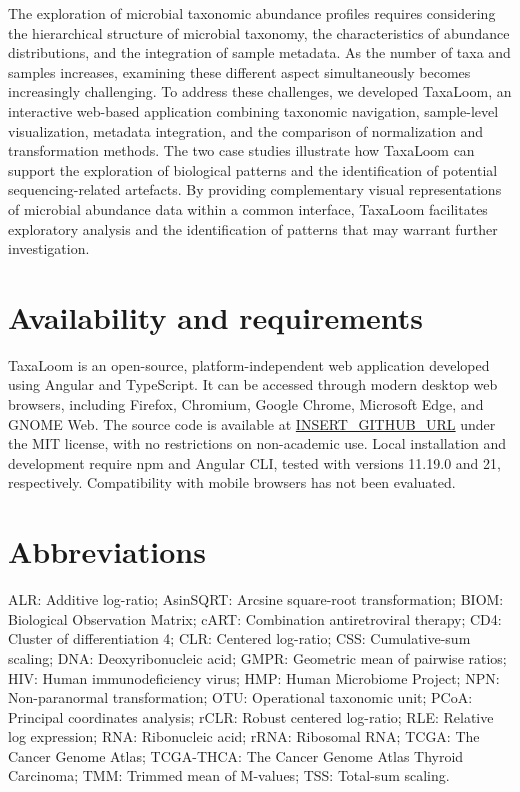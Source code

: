 \documentclass[pdflatex,sn-vancouver-num]{sn-jnl}%
\theoremstyle{thmstyleone}%
\theoremstyle{thmstyletwo}%
\theoremstyle{thmstylethree}%
\begin{document}
The exploration of microbial taxonomic abundance profiles requires considering the hierarchical structure of microbial taxonomy, the characteristics of abundance distributions, and the integration of sample metadata. As the number of taxa and samples increases, examining these different aspect simultaneously becomes increasingly challenging. To address these challenges, we developed TaxaLoom, an interactive web-based application combining taxonomic navigation, sample-level visualization, metadata integration, and the comparison of normalization and transformation methods. The two case studies illustrate how TaxaLoom can support the exploration of biological patterns and the identification of potential sequencing-related artefacts. By providing complementary visual representations of microbial abundance data within a common interface, TaxaLoom facilitates exploratory analysis and the identification of patterns that may warrant further investigation.


\section*{Availability and requirements}\label{sec6}

TaxaLoom is an open-source, platform-independent web application developed using Angular and TypeScript. It can be accessed through modern desktop web browsers, including Firefox, Chromium, Google Chrome, Microsoft Edge, and GNOME Web. The source code is available at \url{INSERT_GITHUB_URL} under the MIT license, with no restrictions on non-academic use. Local installation and development require npm and Angular CLI, tested with versions 11.19.0 and 21, respectively. Compatibility with mobile browsers has not been evaluated.


\section*{Abbreviations}

ALR: Additive log-ratio; AsinSQRT: Arcsine square-root transformation; BIOM: Biological Observation Matrix; cART: Combination antiretroviral therapy; CD4: Cluster of differentiation 4; CLR: Centered log-ratio; CSS: Cumulative-sum scaling; DNA: Deoxyribonucleic acid; GMPR: Geometric mean of pairwise ratios; HIV: Human immunodeficiency virus; HMP: Human Microbiome Project; NPN: Non-paranormal transformation; OTU: Operational taxonomic unit; PCoA: Principal coordinates analysis; rCLR: Robust centered log-ratio; RLE: Relative log expression; RNA: Ribonucleic acid; rRNA: Ribosomal RNA; TCGA: The Cancer Genome Atlas; TCGA-THCA: The Cancer Genome Atlas Thyroid Carcinoma; TMM: Trimmed mean of M-values; TSS: Total-sum scaling.
\end{document}
